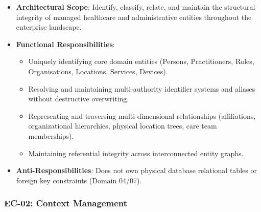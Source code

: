 \begin{itemize}

\item 
\textbf{Architectural Scope}: Identify, classify, relate, and maintain the structural integrity of managed healthcare and administrative entities throughout the enterprise landscape.



\item 
\textbf{Functional Responsibilities}:


\begin{itemize}

\item 
Uniquely identifying core domain entities (Persons, Practitioners, Roles, Organisations, Locations, Services, Devices).



\item 
Resolving and maintaining multi-authority identifier systems and aliases without destructive overwriting.



\item 
Representing and traversing multi-dimensional relationships (affiliations, organizational hierarchies, physical location trees, care team memberships).



\item 
Maintaining referential integrity across interconnected entity graphs.



\end{itemize}


\item 
\textbf{Anti-Responsibilities}: Does not own physical database relational tables or foreign key constraints (Domain 04/\allowbreak{}07).



\end{itemize}
\label{rad:enterprise:112}
\subsubsection*{EC-02: Context Management}
\label{rad:enterprise:113}

